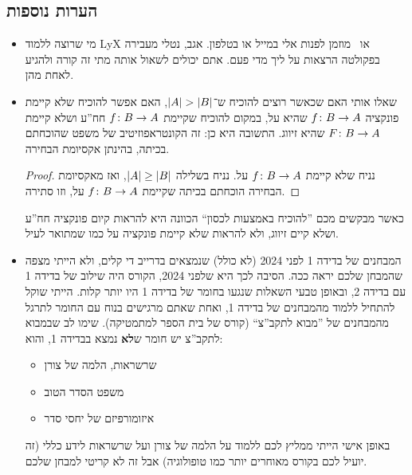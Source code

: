 \documentclass[]{../../../../tex/classes/styledArticle}
\begin{document}
	\subsection*{הערות נוספות}
	\begin{itemize}
		\item מי שרוצה ללמוד LyX או \en{\LaTeX}\ מוזמן לפנות אלי במייל או בטלפון. אגב, נטלי מעבירה בפקולטה הרצאות על ליך מדי פעם. אתם יכולים לשאול אותה מתי זה קורה ולהגיע לאחת מהן. 
		\item שאלו אותי האם שכאשר רוצים להוכיח ש־$\left \lvert A \right \rvert > \left \lvert B \right \rvert$, האם אפשר להוכיח שלא קיימת פונקציה $f \colon B \to A$ שהיא על, במקום להוכיח שקיימת $f \colon B \to A$ חח''ע ושלא קיימת $F \colon B \to A$ שהיא זיווג. התשובה היא כן: זה הקונטראפוזיטיב של משפט שהוכחתם בכיתה, בהינתן אקסיומת הבחירה. 
		\begin{proof}
			נניח שלא קיימת $f \colon B \to A$ על. נניח בשלילה $\left \lvert A \right \rvert \ge \left \lvert B \right \rvert$, ואז מאקסיומת הבחירה הוכחתם בכיתה שקיימת $f \colon B \to A$ על, וזו סתירה. 
		\end{proof}
		כאשר מבקשים מכם ''להוכיח באמצעות לכסון`` הכוונה היא להראות קיום פונקציה חח''ע ושלא קיים זיווג, ולא להראות שלא קיימת פונקציה על כמו שמתואר לעיל. 
		\item המבחנים של בדידה 1 לפני 2024 (לא כולל) שנמצאים בדרייב די קלים, ולא הייתי מצפה שהמבחן שלכם יראה ככה. הסיבה לכך היא שלפני 2024, הקורס היה שילוב של בדידה 1 עם בדידה 2, ובאופן טבעי השאלות שנגעו בחומר של בדידה 1 היו יותר קלות. הייתי שוקל להתחיל ללמוד מהמבחנים של בדידה 1, ואחת שאתם מרגישים בנוח עם החומר לתרגל מהמבחנים של ''מבוא לתקב''צ`` (קורס של בית הספר למתמטיקה). שימו לב שבמבוא לתקב''צ יש חומר ש\textbf{לא} נמצא בבדידה 1, והוא: 
		\begin{itemize}
			\item שרשראות, הלמה של צורן
			\item משפט הסדר הטוב
			\item איזומורפיזם של יחסי סדר
		\end{itemize}
		באופן אישי הייתי ממליץ לכם ללמוד על הלמה של צורן ועל שרשראות לידע כללי (זה יועיל לכם בקורס מאוחרים יותר כמו טופולוגיה) אבל זה לא קריטי למבחן שלכם. 
	\end{itemize}
	
	
	
	\ndoc
\end{document}
